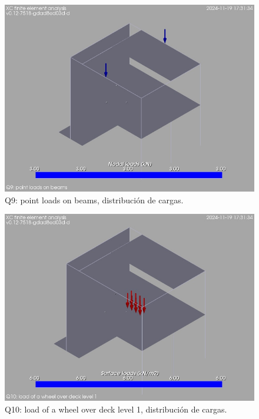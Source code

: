 \begin{figure}[ht]
\begin{center}
\includegraphics[width=\linewidth]{results/graphics/loads/QpntBeamsoverallSet}
\caption{Q9: point loads on beams, distribución de cargas.}
\label{QpntBeamsoverallSet}
\end{center}
\end{figure}
\begin{figure}[ht]
\begin{center}
\includegraphics[width=\linewidth]{results/graphics/loads/QwheelDeck1overallSet}
\caption{Q10: load of a wheel over deck level 1, distribución de cargas.}
\label{QwheelDeck1overallSet}
\end{center}
\end{figure}
